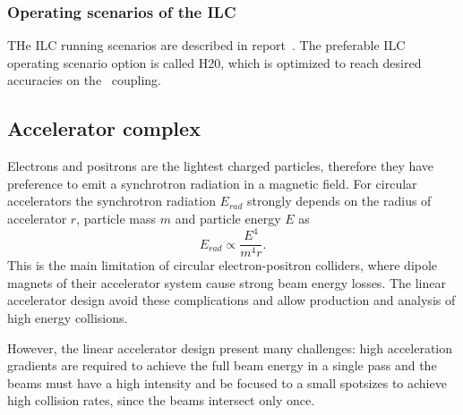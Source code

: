 \subsubsection{Operating scenarios of the ILC}
THe ILC running scenarios are described in report~\cite{bib:H20}. 
The preferable ILC operating scenario option is called H20, which is optimized to reach desired accuracies on the \sm\ coupling.

\subsection{Accelerator complex}
Electrons and positrons are the lightest charged particles, therefore they have preference to emit a synchrotron radiation in a magnetic field. For circular accelerators the synchrotron radiation $E_{rad}$ strongly depends on the radius of accelerator $r$, particle mass $m$ and particle energy $E$ as
\begin{equation}
	E_{rad} \propto \frac{E^4}{m^4r}.
\end{equation}
This is the main limitation of circular electron-positron colliders, where dipole magnets of their accelerator system cause strong beam energy losses. 
The linear accelerator design avoid these complications and allow production and analysis of high energy collisions. 

However, the linear accelerator design present many challenges: high acceleration gradients are required to achieve the full beam energy in a single pass and the beams must have a high intensity and be focused to a small spotsizes to achieve high collision rates, since the beams intersect only once.

